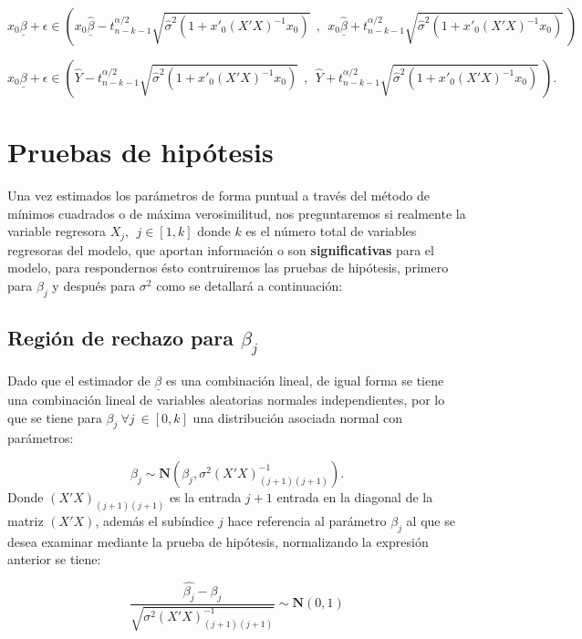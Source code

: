 \documentclass[
  a4paper,
  oneside,
  openany]{book}
\begin{document}
\[x_{0}\underline{\beta}+\epsilon \in\left(x_{0}\underline{\hat{\beta}}-t^{\alpha/2}_{n-k-1}\sqrt{\hat{\sigma}^2\left(1+x'_{0}(X'X)^{-1}x_{0}\right)} \ \ , \ \ x_{0}\underline{\hat{\beta}}+t^{\alpha/2}_{n-k-1}\sqrt{\hat{\sigma}^2\left(1+x'_{0}(X'X)^{-1}x_{0}\right)} \ \right)\]

\[x_{0}\underline{\beta}+\epsilon \in \left(\hat{Y}-t^{\alpha/2}_{n-k-1}\sqrt{\hat{\sigma}^2\left(1+x'_{0}(X'X)^{-1}x_{0}\right)} \ \ , \ \ \hat{Y}+t^{\alpha/2}_{n-k-1}\sqrt{\hat{\sigma}^2\left(1+x'_{0}(X'X)^{-1}x_{0}\right)} \ \right).\]

\hypertarget{pruebas-de-hipuxf3tesis-1}{%
\chapter{Pruebas de hipótesis}\label{pruebas-de-hipuxf3tesis-1}}

Una vez estimados los parámetros de forma puntual a través del método de mínimos cuadrados o de máxima verosimilitud, nos preguntaremos si realmente la variable regresora \(X_{j}, \ \ j \in [1,k]\) donde \(k\) es el número total de variables regresoras del modelo, que aportan información o son \textbf{significativas} para el modelo, para respondernos ésto contruiremos las pruebas de hipótesis, primero para \(\beta_{j}\) y después para \(\sigma^2\) como se detallará a continuación:

\hypertarget{regiuxf3n-de-rechazo-para-beta_j}{%
\section{\texorpdfstring{Región de rechazo para \(\beta_{j}\)}{Región de rechazo para \textbackslash beta\_\{j\}}}\label{regiuxf3n-de-rechazo-para-beta_j}}

Dado que el estimador de \(\underline{\beta}\) es una combinación lineal, de igual forma se tiene una combinación lineal de variables aleatorias normales independientes, por lo que se tiene para \(\beta_{j} \ \forall j \ \in [0,k]\) una distribución asociada normal con parámetros:

\[\beta_{j} \sim \mathbf{N} \left(\beta_{j},\sigma^2(X'X)^{-1}_{(j+1)(j+1)}\right).\]
Donde \((X'X)_{(j+1)(j+1)}\) es la entrada \(j+1\) entrada en la diagonal de la matriz \((X'X)\), además el subíndice \(j\) hace referencia al parámetro \(\beta_{j}\) al que se desea examinar mediante la prueba de hipótesis, normalizando la expresión anterior se tiene:

\[\frac{\hat{\beta_{j}}-\beta_{j}}{\sqrt{\sigma^2(X'X)^{-1}_{(j+1)(j+1)}}} \sim \mathbf{N}(0,1)\]
\end{document}
